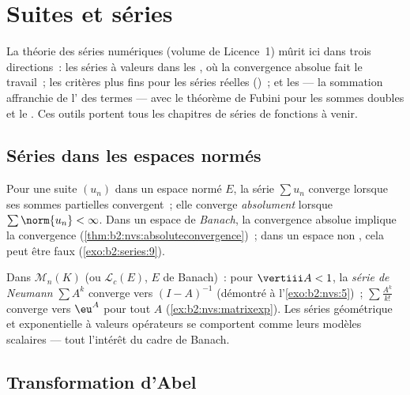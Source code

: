 \chapter{Suites et séries}\label{ch:b2:series}

La théorie des séries numériques (volume de Licence~1) mûrit ici dans
trois directions~: les séries à valeurs dans les , où
la convergence absolue fait le travail~; les critères plus fins pour
les séries réelles ()~; et les \emph{} --- la sommation affranchie de l' des termes --- avec
le théorème de Fubini pour les sommes doubles et le .
Ces outils portent tous les chapitres de séries de fonctions à venir.

\section{Séries dans les espaces normés}

\begin{definition}\label{def:b2:series:def}
Pour une suite $(u_n)$ dans un espace normé $E$, la série $\sum u_n$
converge lorsque ses sommes partielles convergent~; elle converge
\emph{absolument}
lorsque $\sum \norm{u_n} < \infty$. Dans un espace de \emph{Banach},
la convergence absolue implique la convergence
(\cref{thm:b2:nvs:absoluteconvergence})~; dans un espace non ,
cela peut être faux (\cref{exo:b2:series:9}).
\end{definition}

\begin{example}\label{ex:b2:series:neumann}
Dans $\mathcal{M}_n(K)$ (ou $\mathcal{L}_c(E)$, $E$ de Banach)~: pour
$\vertiii A < 1$, la \emph{série de Neumann} $\sum A^k$ converge
 vers $(I - A)^{-1}$ (démontré à l'\cref{exo:b2:nvs:5})~;
$\sum \frac{A^k}{k!}$ converge  vers $\eu^A$ pour tout $A$
(\cref{ex:b2:nvs:matrixexp}). Les séries géométrique et exponentielle
à valeurs opérateurs se comportent comme leurs modèles scalaires ---
tout l'intérêt du cadre de Banach.
\end{example}

\section{Transformation d'Abel}

